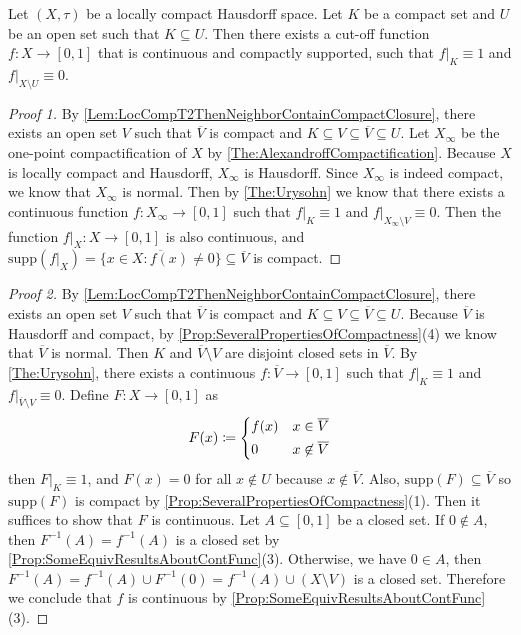 \documentclass[screen]{techreport}
\numberwithin{equation}{section}
\begin{document}
\begin{theorem}\label{The:LocCompT2StrongerCutOff}
	Let $(X,\tau)$ be a locally compact Hausdorff space.
	Let $K$ be a compact set and $U$ be an open set such that $K \subseteq U$.
	Then there exists a cut-off function $f : X \to [0,1]$ that is continuous and compactly supported, such that $f|_K \equiv 1$ and $f|_{X \setminus U} \equiv 0$.
\end{theorem}
\begin{proof}[Proof 1]
	By \cref{Lem:LocCompT2ThenNeighborContainCompactClosure}, there exists an open set $V$ such that $\overline{V}$ is compact and $K \subseteq V \subseteq \overline{V} \subseteq U$.
	Let $X_\infty$ be the one-point compactification of $X$ by \cref{The:AlexandroffCompactification}.
	Because $X$ is locally compact and Hausdorff, $X_\infty$ is Hausdorff.
	Since $X_\infty$ is indeed compact, we know that $X_\infty$ is normal.
	Then by \cref{The:Urysohn} we know that there exists a continuous function $f : X_\infty \to [0,1]$ such that $f|_K \equiv 1$ and $f |_{X_\infty \setminus V } \equiv 0$.
	Then the function $f|_X : X \to [0,1]$ is also continuous, and $\mathrm{supp}(f|_X) = \overline{\{x \in X: f(x) \neq 0\}} \subseteq \overline{V}$ is compact.
\end{proof}
\begin{proof}[Proof 2]
	By \cref{Lem:LocCompT2ThenNeighborContainCompactClosure}, there exists an open set $V$ such that $\overline{V}$ is compact and $K \subseteq V \subseteq \overline{V} \subseteq U$.
	Because $\overline{V}$ is Hausdorff and compact, by \cref{Prop:SeveralPropertiesOfCompactness}(4) we know that $\overline{V}$ is normal.
	Then $K$ and $\overline{V} \setminus V$ are disjoint closed sets in $\overline{V}$.
	By \cref{The:Urysohn}, there exists a continuous $f : \overline{V} \to [0,1]$ such that $f|_K \equiv 1$ and $f|_{\overline{V} \setminus V} \equiv 0$.
	Define $F : X \to [0,1]$ as
	\[
	F(x) \coloneqq \begin{dcases}
 		f(x) & x \in \overline{V} \\
 		0 & x \not\in \overline{V}
 	\end{dcases}
	\]
	then $F|_K \equiv 1$, and $F(x) = 0$ for all $x \not\in U$ because $x \not\in \overline{V}$.
	Also, $\mathrm{supp}(F) \subseteq \overline{V}$ so $\mathrm{supp}(F)$ is compact by \cref{Prop:SeveralPropertiesOfCompactness}(1).
	Then it suffices to show that $F$ is continuous.
	Let $A \subseteq [0,1]$ be a closed set.
	If $0 \not\in A$, then $F^{-1}(A) = f^{-1}(A)$ is a closed set by \cref{Prop:SomeEquivResultsAboutContFunc}(3).
	Otherwise, we have $0 \in A$, then $F^{-1}(A) = f^{-1}(A) \cup F^{-1}(0) = f^{-1}(A) \cup (X \setminus V)$ is a closed set.
	Therefore we conclude that $f$ is continuous by \cref{Prop:SomeEquivResultsAboutContFunc}(3).
\end{proof}
\end{document}
